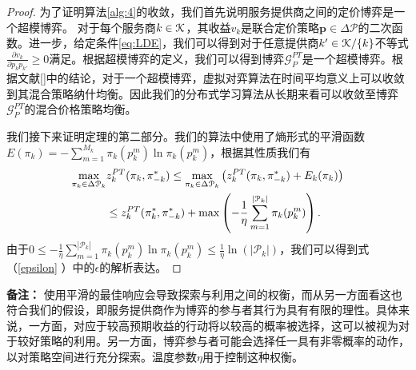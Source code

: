 \begin{proof}
为了证明算法\ref{alg:4}的收敛，我们首先说明服务提供商之间的定价博弈是一个超模博弈。
对于每个服务商$k\in\mathcal{K}$，其收益$v_k$是联合定价策略$\mathbf{p}\in\Delta\mathcal{P}$的二次函数。进一步，给定条件\ref{eq:LDE}，我们可以得到对于任意提供商$k'\in\mathcal{K}/\{k\}$不等式$\frac{\partial v_k}{\partial p_kp_{k'}}\geq 0$满足。根据超模博弈的定义\cite{Fudenberg}，我们可以得到博弈$\mathcal{G}^{PT}_{P}$是一个超模博弈。根据文献[]中的结论，对于一个超模博弈，虚拟对弈算法在时间平均意义上可以收敛到其混合策略纳什均衡。因此我们的分布式学习算法从长期来看可以收敛至博弈$\mathcal{G}^{PT}_{P}$的混合价格策略均衡。

我们接下来证明定理的第二部分。我们的算法中使用了熵形式的平滑函数$E(\pi_k)=-\sum_{m=1}^{M_k}\pi_k(p_{k}^{m})\ln \pi_k(p_{k}^{m})$，根据其性质我们有
\begin{align}
\max_{\pi_k\in\Delta\mathcal{P}_k}&z_k^{PT}(\pi_k,\pi^*_{-k})\leq\max_{\pi_k\in\Delta\mathcal{P}_k}\left(z_k^{PT}(\pi_k,\pi^*_{-k})+E_k(\pi_k)\right)\nonumber\\
&\leq z_k^{PT}(\pi^*_k,\pi^*_{-k})+\max\left(-\frac{1}{\eta}\sum_{m=1}^{|\mathcal{P}_k|}\pi_k(p_k^m)\right).\nonumber
\end{align}
由于$0\leq -\frac{1}{\eta}\sum_{m=1}^{|\mathcal{P}_k|}\pi_k(p_k^m)\ln \pi_k(p_k^m)\leq\frac{1}{\eta}\ln(|\mathcal{P}_k|)$，我们可以得到式（\ref{epsilon}
）中的$\epsilon$的解析表达。
\end{proof}

\noindent\textbf{备注：} 使用平滑的最佳响应会导致探索与利用之间的权衡，而从另一方面看这也符合我们的假设，即服务提供商作为博弈的参与者其行为具有有限的理性。具体来说，一方面，对应于较高预期收益的行动将以较高的概率被选择，这可以被视为对于较好策略的利用。另一方面，博弈参与者可能会选择任一具有非零概率的动作，以对策略空间进行充分探索。温度参数$\eta$用于控制这种权衡。

